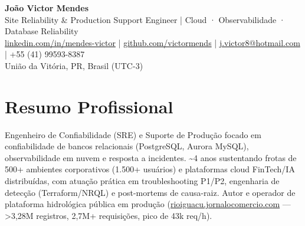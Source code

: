 \documentclass[10pt,a4paper]{article}
\begin{document}
\begin{center}
    {\huge \textbf{João Victor Mendes}} \\
    \vspace{2pt}
    {\large Site Reliability \& Production Support Engineer | Cloud · Observabilidade · Database Reliability} \\
    \vspace{1.5pt}
    \href{https://linkedin.com/in/mendes-victor}{linkedin.com/in/mendes-victor} | \href{https://github.com/victormends}{github.com/victormends} | \href{mailto:j.victor8@hotmail.com}{j.victor8@hotmail.com} | +55 (41) 99593-8387 \\
    União da Vitória, PR, Brasil (\mbox{UTC-3})
\end{center}

\section{Resumo Profissional}
Engenheiro de Confiabilidade (SRE) e Suporte de Produção focado em confiabilidade de bancos relacionais (PostgreSQL, Aurora MySQL), observabilidade em nuvem e resposta a incidentes. \textasciitilde{}4 anos sustentando frotas de 500+ ambientes corporativos (1.500+ usuários) e plataformas cloud FinTech/IA distribuídas, com atuação prática em troubleshooting \mbox{P1/P2}, engenharia de detecção (Terraform/NRQL) e \mbox{post-mortems} de \mbox{causa-raiz}. Autor e operador de plataforma hidrológica pública em produção (\href{https://rioiguacu.jornalocomercio.com}{rioiguacu.jornalocomercio.com} --- >3,28M registros, 2,7M+ requisições, pico de 43k req/h).

\end{document}
